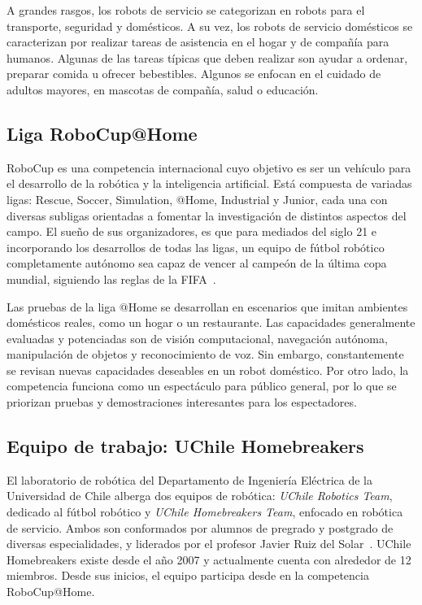 A grandes rasgos, los robots de servicio se categorizan en robots para el transporte, seguridad y domésticos. A su vez, los robots de servicio domésticos se caracterizan por realizar tareas de asistencia en el hogar y de compañía para humanos. Algunas de las tareas típicas que deben realizar son ayudar a ordenar, preparar comida u ofrecer bebestibles. Algunos se enfocan en el cuidado de adultos mayores, en mascotas de compañía, salud o educación.

\subsection{Liga RoboCup@Home}

RoboCup es una competencia internacional cuyo objetivo es ser un vehículo para el desarrollo de la robótica y la inteligencia artificial. Está compuesta de variadas ligas: Rescue, Soccer, Simulation, @Home, Industrial y Junior, cada una con diversas subligas orientadas a fomentar la investigación de distintos aspectos del campo. El sueño de sus organizadores, es que para mediados del siglo 21 e incorporando los desarrollos de todas las ligas, un equipo de fútbol robótico completamente autónomo sea capaz de vencer al campeón de la última copa mundial, siguiendo las reglas de la FIFA~\cite{robocup:rulebook_2018}.

Las pruebas de la liga @Home se desarrollan en escenarios que imitan ambientes domésticos reales, como un hogar o un restaurante. Las capacidades generalmente evaluadas y potenciadas son de visión computacional, navegación autónoma, manipulación de objetos y reconocimiento de voz. Sin embargo, constantemente se revisan nuevas capacidades deseables en un robot doméstico. Por otro lado, la competencia funciona como un espectáculo para público general, por lo que se priorizan pruebas y demostraciones interesantes para los espectadores.

\subsection{Equipo de trabajo: UChile Homebreakers}

El laboratorio de robótica del Departamento de Ingeniería Eléctrica de la Universidad de Chile alberga dos equipos de robótica: \textit{UChile Robotics Team}, dedicado al fútbol robótico y \textit{UChile Homebreakers Team}, enfocado en robótica de servicio. Ambos son conformados por alumnos de pregrado y postgrado de diversas especialidades, y liderados por el profesor Javier Ruiz del Solar~\cite{uchile-robotics}. UChile Homebreakers existe desde el año 2007 y actualmente cuenta con alrededor de 12 miembros. Desde sus inicios, el equipo participa desde en la competencia RoboCup@Home.


